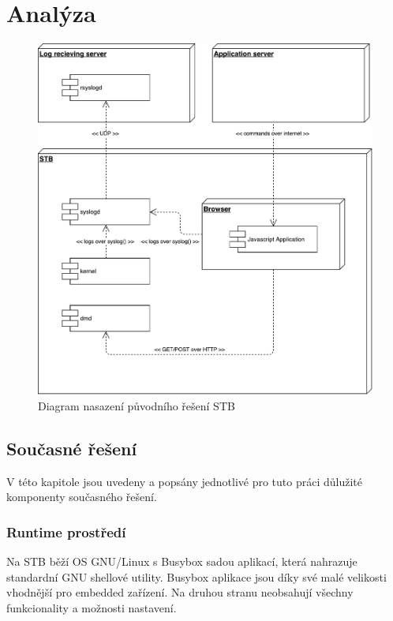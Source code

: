 \documentclass[thesis=B,czech]{FITthesis}[2012/06/26]
\begin{document}
\chapter{Analýza}

\begin{figure}[!h]
	\centering
	\includegraphics[scale=0.5]{images/STB}
	\caption[STB]{Diagram nasazení původního řešení STB}
\end{figure}

\section{Současné řešení}
V této kapitole jsou uvedeny a popsány jednotlivé pro tuto práci důlužité komponenty současného řešení.

\subsection{Runtime prostředí}
Na STB běží OS GNU/Linux s Busybox sadou aplikací, která nahrazuje standardní GNU shellové utility. Busybox aplikace jsou díky své malé velikosti vhodnější pro embedded zařízení. Na druhou stranu neobsahují všechny funkcionality a možnosti nastavení.
\end{document}
